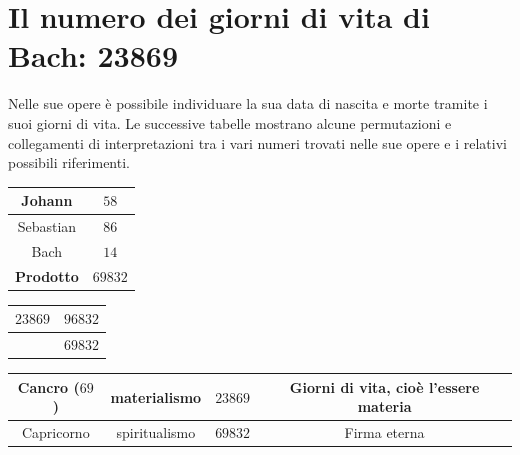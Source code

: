 \documentclass[12pt]{article}
\begin{document}
\section{Il numero dei giorni di vita di Bach: 23869}
Nelle sue opere è possibile individuare la sua data di nascita e morte tramite i suoi giorni di vita.
Le successive tabelle mostrano alcune permutazioni e collegamenti di interpretazioni tra i vari numeri trovati nelle sue opere e i relativi possibili riferimenti.

\begin{center}
\begin{tabular}{|c|c|} 
  \hline
  Johann & $58$\\
  \hline
  Sebastian & $86$\\ 
  \hline
  Bach & $14$\\ 
  \hline
  \textbf{Prodotto} & $69832$\\ 
  \hline
\end{tabular}
\end{center}

\begin{center}
\begin{tabular}{|c|c|}  
  \hline
  $23869$ & $96832$\\
  \hline
  & $69832$\\
  \hline
\end{tabular}
\end{center}

\begin{center}
\begin{tabular}{|c|c|c|c|} 
  \hline
  Cancro ($69$) & materialismo & $23869$ & Giorni di vita, cioè l’essere materia\\
  \hline
  Capricorno & spiritualismo & $69832$ &  Firma eterna\\
  \hline
\end{tabular}
\end{center}


\begin{center}
\end{center}
\end{document}
